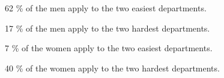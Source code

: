 \documentclass[landscape]{exam}
\begin{document}
  \begin{itemize*}
    \item 62 \% of the men apply to the two easiest departments.
    \item 17 \% of the men apply to the two hardest departments.
    \item 7 \% of the women apply to the two easiest departments.
    \item 40 \% of the women apply to the two hardest departments.
  \end{itemize*}
\end{document}

